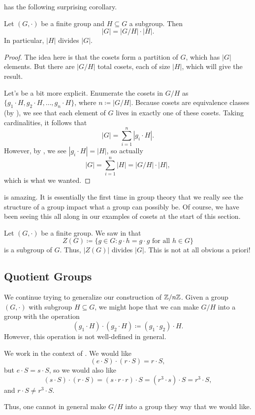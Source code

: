 \documentclass[../main.tex]{subfiles}
\begin{document}
 has the following surprising corollary.
\begin{corollary} \label{cor:ord-subgroup}
    Let $(G,\cdot)$ be a finite group and $H\subseteq G$ a subgroup. Then
    \[|G|=|G/H|\cdot|H|.\]
    In particular, $|H|$ divides $|G|$.
\end{corollary}
\begin{proof}
    The idea here is that the cosets form a partition of $G$, which has $|G|$ elements. But there are $|G/H|$ total cosets, each of size $|H|$, which will give the result.
    
    Let's be a bit more explicit. Enumerate the cosets in $G/H$ as $\{g_1\cdot H,g_2\cdot H,\ldots,g_n\cdot H\}$, where $n\coloneqq|G/H|$. Because cosets are equivalence classes (by ), we see that each element of $G$ lives in exactly one of these cosets. Taking cardinalities, it follows that
    \[|G|=\sum_{i=1}^n|g_i\cdot H|.\]
    However, by , we see $|g_i\cdot H|=|H|$, so actually
    \[|G|=\sum_{i=1}^n|H|=|G/H|\cdot |H|,\]
    which is what we wanted.
\end{proof}
 is amazing. It is essentially the first time in group theory that we really see the structure of a group impact what a group can possibly be. Of course, we have been seeing this all along in our examples of cosets at the start of this section.
\begin{example}
    Let $(G,\cdot)$ be a finite group. We saw in  that
    \[Z(G)\coloneqq\{g\in G:g\cdot h=g\cdot g\text{ for all }h\in G\}\]
    is a subgroup of $G$. Thus, $|Z(G)|$ divides $|G|$. This is not at all obvious a priori!
\end{example}

\subsection{Quotient Groups}
We continue trying to generalize our construction of $\mathbb Z/n\mathbb Z$. Given a group $(G,\cdot)$ with subgroup $H\subseteq G$, we might hope that we can make $G/H$ into a group with the operation
\[(g_1\cdot H)\cdot(g_2\cdot H)\coloneqq(g_1\cdot g_2)\cdot H.\]
However, this operation is not well-defined in general.
\begin{example} \label{ex:bad-quotient}
    We work in the context of . We would like
    \[(e\cdot S)\cdot(r\cdot S)=r\cdot S,\]
    but $e\cdot S=s\cdot S$, so we would also like
    \[(s\cdot S)\cdot(r\cdot S)=(s\cdot r\cdot r)\cdot S=\left(r^3\cdot s\right)\cdot S=r^3\cdot S,\]
    and $r\cdot S\ne r^3\cdot S$.
\end{example}
Thus, one cannot in general make $G/H$ into a group they way that we would like.
\end{document}

